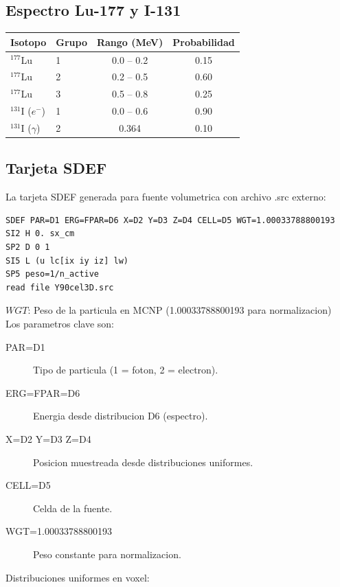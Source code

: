 \documentclass[12pt,a4paper]{article}
\newcommand{\vardef}[2]{\noindent\textbf{#1}: #2\\}
\begin{document}
\subsection{Espectro Lu-177 y I-131}

\begin{center}
\begin{tabular}{llcc}
\toprule
\textbf{Isotopo} & \textbf{Grupo} & \textbf{Rango (MeV)} & \textbf{Probabilidad} \\
\midrule
$^{177}$Lu & 1 & 0.0 -- 0.2 & 0.15 \\
$^{177}$Lu & 2 & 0.2 -- 0.5 & 0.60 \\
$^{177}$Lu & 3 & 0.5 -- 0.8 & 0.25 \\
\midrule
$^{131}$I ($e^-$) & 1 & 0.0 -- 0.6 & 0.90 \\
$^{131}$I ($\gamma$) & 2 & 0.364 & 0.10 \\
\bottomrule
\end{tabular}
\end{center}

\subsection{Tarjeta SDEF}

La tarjeta SDEF generada para fuente volumetrica con archivo .src externo:

\begin{verbatim}
SDEF PAR=D1 ERG=FPAR=D6 X=D2 Y=D3 Z=D4 CELL=D5 WGT=1.00033788800193
SI2 H 0. sx_cm
SP2 D 0 1
SI5 L (u lc[ix iy iz] lw)
SP5 peso=1/n_active
read file Y90cel3D.src
\end{verbatim}

\vardef{$WGT$}{Peso de la particula en MCNP (1.00033788800193 para normalizacion)}

Los parametros clave son:

\begin{description}
    \item[PAR=D1] Tipo de particula (1 = foton, 2 = electron).
    \item[ERG=FPAR=D6] Energia desde distribucion D6 (espectro).
    \item[X=D2 Y=D3 Z=D4] Posicion muestreada desde distribuciones uniformes.
    \item[CELL=D5] Celda de la fuente.
    \item[WGT=1.00033788800193] Peso constante para normalizacion.
\end{description}

Distribuciones uniformes en voxel:
\end{document}
